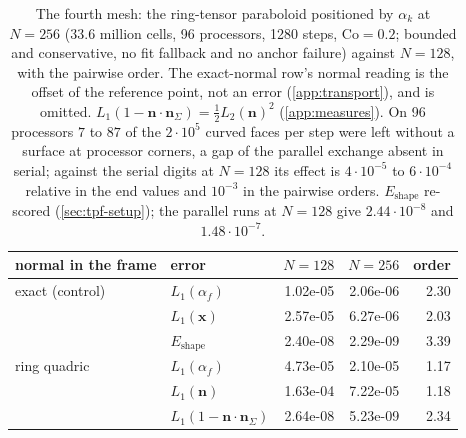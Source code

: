 \documentclass[preprint,12pt]{elsarticle}
\begin{document}
\begin{table}[htbp]
\centering
\caption{The translated plane of \cref{tab:tpf-plane} with the ring-tensor paraboloid positioned by $\alpha_k$ and the dual advection, in the format of that table: per normal source and Courant number the number of the eight runs in which the face fractions and the normal stay at round-off over the whole run, and the run maximum of $L_1(\alpha_f)$ at $N = 160$ and $\mathrm{Co} = 0.5$ on the normal arm. Table body generated by \texttt{make\_table\_advection.py}.}
\label{tab:tpf-curved-plane}
\footnotesize
\setlength{\tabcolsep}{4pt}
\resizebox{0.8\linewidth}{!}{}
\end{table}

\begin{table}[htbp]
\centering
\caption{The fourth mesh: the ring-tensor paraboloid positioned by $\alpha_k$ at $N = 256$ ($33.6$ million cells, 96 processors, 1280 steps, $\mathrm{Co} = 0.2$; bounded and conservative, no fit fallback and no anchor failure) against $N = 128$, with the pairwise order. The exact-normal row's normal reading is the offset of the reference point, not an error (\ref{app:transport}), and is omitted. $L_1(1-\mathbf{n}\cdot\mathbf{n}_\Sigma) = \tfrac12 L_2(\mathbf{n})^2$ (\ref{app:measures}). On 96 processors $7$ to $87$ of the $2\cdot10^5$ curved faces per step were left without a surface at processor corners, a gap of the parallel exchange absent in serial; against the serial digits at $N = 128$ its effect is $4\cdot10^{-5}$ to $6\cdot10^{-4}$ relative in the end values and $10^{-3}$ in the pairwise orders. $E_{\mathrm{shape}}$ re-scored (\cref{sec:tpf-setup}); the parallel runs at $N = 128$ give $2.44\cdot10^{-8}$ and $1.48\cdot10^{-7}$.}
\label{tab:tpf-n256}
\footnotesize
\begin{tabular}{llrrr}
\toprule
normal in the frame & error & $N = 128$ & $N = 256$ & order \\
\midrule
exact (control) & $L_1(\alpha_f)$ & 1.02e-05 & 2.06e-06 & 2.30 \\
 & $L_1(\mathbf{x})$ & 2.57e-05 & 6.27e-06 & 2.03 \\
 & $E_{\mathrm{shape}}$ & 2.40e-08 & 2.29e-09 & 3.39 \\
ring quadric & $L_1(\alpha_f)$ & 4.73e-05 & 2.10e-05 & 1.17 \\
 & $L_1(\mathbf{n})$ & 1.63e-04 & 7.22e-05 & 1.18 \\
 & $L_1(1-\mathbf{n}\cdot\mathbf{n}_\Sigma)$ & 2.64e-08 & 5.23e-09 & 2.34 \\

\end{tabular}
\end{table}
\end{document}
